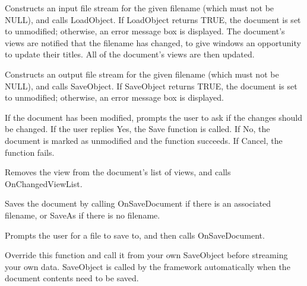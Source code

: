 

Constructs an input file stream for the given filename (which must not be NULL),
and calls LoadObject. If LoadObject returns TRUE, the document is set to
unmodified; otherwise, an error message box is displayed. The document's
views are notified that the filename has changed, to give windows an opportunity
to update their titles. All of the document's views are then updated.



Constructs an output file stream for the given filename (which must not be NULL),
and calls SaveObject. If SaveObject returns TRUE, the document is set to
unmodified; otherwise, an error message box is displayed.



If the document has been modified, prompts the user to ask if the changes should
be changed. If the user replies Yes, the Save function is called. If No, the
document is marked as unmodified and the function succeeds. If Cancel, the
function fails.



Removes the view from the document's list of views, and calls OnChangedViewList.



Saves the document by calling OnSaveDocument if there is an associated filename,
or SaveAs if there is no filename.



Prompts the user for a file to save to, and then calls OnSaveDocument.



Override this function and call it from your own SaveObject before
streaming your own data. SaveObject is called by the framework
automatically when the document contents need to be saved.

